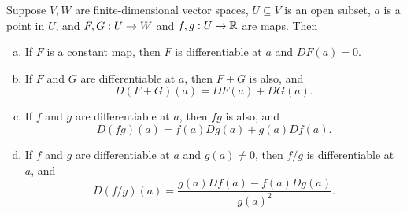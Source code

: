 \documentclass[11pt,a4paper]{article}
\begin{document}
\begin{proposition}
Suppose $V,W$ are finite-dimensional vector spaces, $U\subseteq V$ is an open subset, $a$ is a point in $U$, and $F,G:U\rightarrow W$ and $f,g:U\rightarrow \mathbb{R}$ are maps. Then 
\begin{enumerate}[(a)]
    \item If $F$ is a constant map, then $F$ is differentiable at $a$ and $DF(a) = 0$.
    \item If $F$ and $G$ are differentiable at $a$, then $F+G$ is also, and \begin{equation*}
        D(F+G)(a) = DF(a)+DG(a).
    \end{equation*}
    \item If $f$ and $g$ are differentiable at $a$, then $fg$ is also, and \begin{equation*}
        D(fg)(a) = f(a)Dg(a)+g(a)Df(a).
    \end{equation*}
    \item If $f$ and $g$ are differentiable at $a$ and $g(a)\neq 0$, then $f/g$ is differentiable at $a$, and 
    \begin{equation*}
        D(f/g)(a) = \dfrac{g(a)Df(a)-f(a)Dg(a)}{g(a)^2}.
    \end{equation*}
\end{enumerate}
\end{proposition}
\end{document}
